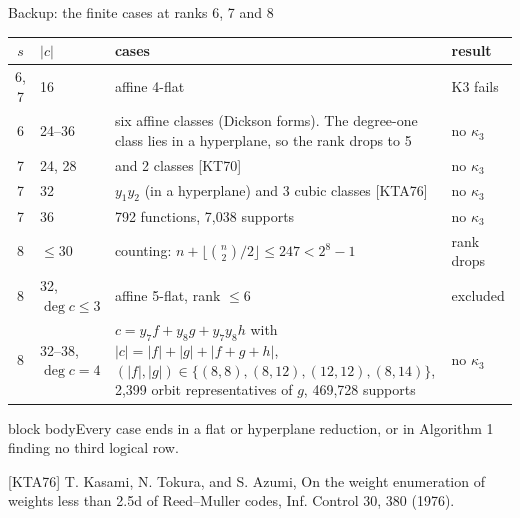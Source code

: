 \documentclass[aspectratio=169,11pt]{beamer}
\newcommand{\takeaway}[1]{\vfill\begin{beamercolorbox}[sep=1ex,wd=\linewidth]{block body}#1\end{beamercolorbox}}
\newcommand{\source}[1]{\par\vfill{\tiny\color{black!60}\setlength{\parskip}{1pt}#1\par}}
\newcommand{\talktext}{\small\setlength{\parskip}{2.5pt}\setlength{\abovedisplayskip}{5pt}\setlength{\belowdisplayskip}{5pt}\setlength{\abovedisplayshortskip}{3pt}\setlength{\belowdisplayshortskip}{3pt}}
\begin{document}
\begin{frame}[label=b-cases]{Backup: the finite cases at ranks 6, 7 and 8}
\talktext
\begin{center}\scriptsize\renewcommand{\arraystretch}{.98}
\begin{tabular}{@{}cl>{\raggedright\arraybackslash}p{}l@{}}\toprule
$s$ & $|c|$ & cases & result\\\midrule
6, 7 & 16 & affine 4-flat & K3 fails\\
6 & 24--36 & six affine classes (Dickson forms). The degree-one class lies in a hyperplane, so the rank drops to 5 & no $\kappa_3$\\
7 & 24, 28 & 1 and 2 classes [KT70] & no $\kappa_3$\\
7 & 32 & $y_1y_2$ (in a hyperplane) and 3 cubic classes [KTA76] & no $\kappa_3$\\
7 & 36 & 9{,}792 functions, 7{,}038 supports & no $\kappa_3$\\
8 & $\le30$ & counting: $n+\lfloor\binom n2/2\rfloor\le247<2^8-1$ & rank drops\\
8 & 32, $\deg c\le3$ & affine 5-flat, rank $\le6$ & excluded\\
8 & 32--38, $\deg c=4$ & $c=y_7f+y_8g+y_7y_8h$ with $|c|=|f|+|g|+|f+g+h|$, $(|f|,|g|)\in\{(8,8),(8,12),(12,12),(8,14)\}$, 2{,}399 orbit representatives of $g$, 469{,}728 supports & no $\kappa_3$\\\bottomrule
\end{tabular}\end{center}
\takeaway{Every case ends in a flat or hyperplane reduction, or in Algorithm 1 finding no third logical row.}
\source{[KTA76] T. Kasami, N. Tokura, and S. Azumi, On the weight enumeration of weights less than 2.5d of Reed--Muller codes, Inf. Control 30, 380 (1976).}
\end{frame}
\end{document}
